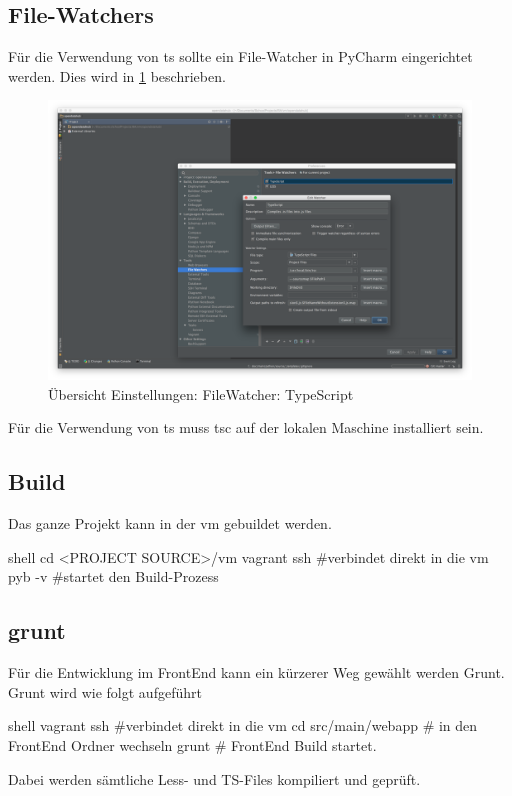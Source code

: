\subsection{File-Watchers}
Für die Verwendung von \ac{ts} sollte ein File-Watcher in PyCharm eingerichtet werden. Dies wird in \cref{fig:sd:watcher-typescript} beschrieben.
\begin{figure}[H]
	\centering
	\includegraphics[width=\linewidth]{fig/watcher_typescript}
	\caption{Übersicht Einstellungen: FileWatcher: TypeScript}
	\label{fig:sd:watcher-typescript}
\end{figure}
Für die Verwendung von \ac{ts} muss tsc auf der lokalen Maschine installiert sein.

\subsection{Build}
Das ganze Projekt kann in der \ac{vm} gebuildet werden. 
\begin{src}{shell}
cd <PROJECT SOURCE>/vm
vagrant ssh #verbindet direkt in die vm
pyb -v #startet den Build-Prozess
\end{src}
\subsection{grunt}
Für die Entwicklung im FrontEnd kann ein kürzerer Weg gewählt werden \textendash  Grunt.
Grunt wird wie folgt aufgeführt
\begin{src}{shell}
vagrant ssh #verbindet direkt in die vm
cd src/main/webapp # in den FrontEnd Ordner wechseln
grunt # FrontEnd Build startet.
\end{src}
Dabei werden sämtliche Less- und  TS-Files kompiliert und geprüft.
